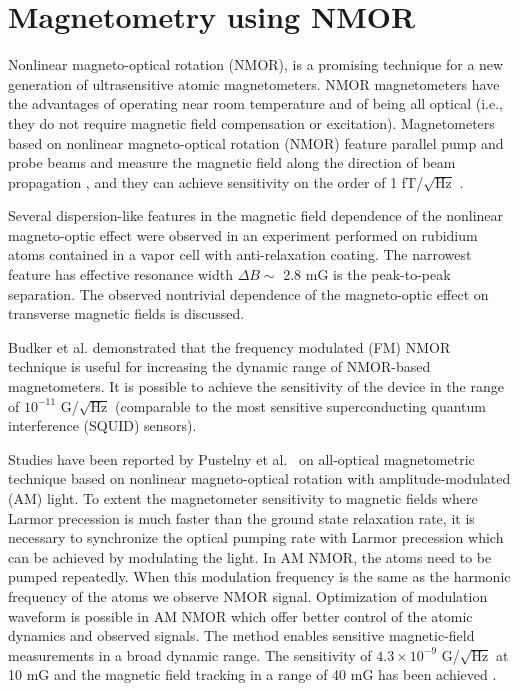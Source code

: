 \section{Magnetometry using NMOR\label{sec:magnetometry literature review}}

Nonlinear magneto-optical rotation (NMOR), is a promising technique for a new generation of ultrasensitive atomic magnetometers. NMOR
magnetometers have the advantages of operating near room temperature and of being all optical
(i.e., they do not require magnetic field compensation or excitation). Magnetometers based on nonlinear
magneto-optical rotation (NMOR) feature parallel pump and probe beams and measure
the magnetic field along the direction of beam propagation \cite{bib:Budker2002} , and they can achieve sensitivity on the order of 1 fT/$\sqrt{\text{Hz}}$ \cite{bib:sensitivemagnetometry}. 
 
Several dispersion-like features in the magnetic field dependence of the nonlinear magneto-optic effect
were observed \cite{bib:UltranarrowWidths} in an experiment performed on rubidium atoms contained in a vapor cell with anti-relaxation
coating. The narrowest feature has effective resonance width $\Delta B \sim$ 2.8 mG is the
peak-to-peak separation. The observed nontrivial dependence of the magneto-optic effect on transverse
magnetic fields is discussed.

Budker et al. \cite{bib:FMNMOR} demonstrated that the frequency modulated (FM) NMOR technique is useful for increasing the dynamic range of NMOR-based magnetometers.  It is possible to achieve the  sensitivity of the device in the range of  $10^{-11} $ G/$\sqrt{\text{Hz}}$ \cite{doi:10.1063/1.3225917} (comparable to the most sensitive superconducting quantum interference (SQUID) sensors).

 Studies have been reported by  Pustelny et al.~\cite{bib:AMNMOR,bib:amNMOR} on all-optical magnetometric technique based on nonlinear magneto-optical rotation with amplitude-modulated (AM) light. To extent the magnetometer sensitivity to magnetic fields where Larmor
precession is much faster than the ground state relaxation rate, it is
necessary to synchronize the optical pumping rate with Larmor
precession which can be achieved by modulating the light. In AM NMOR, the atoms need to be pumped repeatedly. When this modulation frequency is the same as the harmonic
frequency of the atoms we observe NMOR signal. Optimization of modulation waveform is possible in AM NMOR which offer better control of the atomic dynamics and observed signals. The method enables sensitive magnetic-field measurements in a broad dynamic range. The sensitivity of  $4.3\times10^{-9}$ G/$\sqrt{\text{Hz}}$ at 10 mG and the magnetic field tracking in a range of 40 mG has been achieved \cite{bib:AMNMOR}. 

